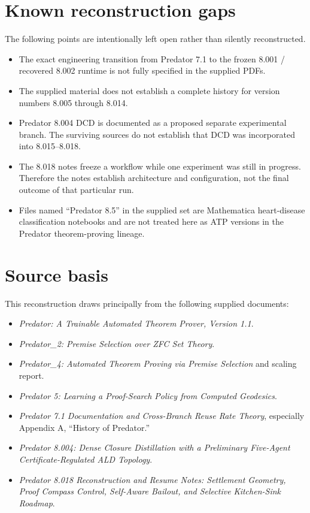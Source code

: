 \documentclass[11pt]{article}
\begin{document}
\section{Known reconstruction gaps}

\begin{warningbox}
The following points are intentionally left open rather than silently reconstructed.
\end{warningbox}

\begin{itemize}
\item The exact engineering transition from Predator 7.1 to the frozen 8.001 / recovered 8.002 runtime is not fully specified in the supplied PDFs.
\item The supplied material does not establish a complete history for version numbers 8.005 through 8.014.
\item Predator 8.004 DCD is documented as a proposed separate experimental branch. The surviving sources do not establish that DCD was incorporated into 8.015--8.018.
\item The 8.018 notes freeze a workflow while one experiment was still in progress. Therefore the notes establish architecture and configuration, not the final outcome of that particular run.
\item Files named ``Predator 8.5'' in the supplied set are Mathematica heart-disease classification notebooks and are not treated here as ATP versions in the Predator theorem-proving lineage.
\end{itemize}

\section{Source basis}

This reconstruction draws principally from the following supplied documents:

\begin{itemize}
\item \textit{Predator: A Trainable Automated Theorem Prover, Version 1.1}.
\item \textit{Predator\_2: Premise Selection over ZFC Set Theory}.
\item \textit{Predator\_4: Automated Theorem Proving via Premise Selection} and scaling report.
\item \textit{Predator 5: Learning a Proof-Search Policy from Computed Geodesics}.
\item \textit{Predator 7.1 Documentation and Cross-Branch Reuse Rate Theory}, especially Appendix A, ``History of Predator.''
\item \textit{Predator 8.004: Dense Closure Distillation with a Preliminary Five-Agent Certificate-Regulated ALD Topology}.
\item \textit{Predator 8.018 Reconstruction and Resume Notes: Settlement Geometry, Proof Compass Control, Self-Aware Bailout, and Selective Kitchen-Sink Roadmap}.
\end{itemize}
\end{document}
